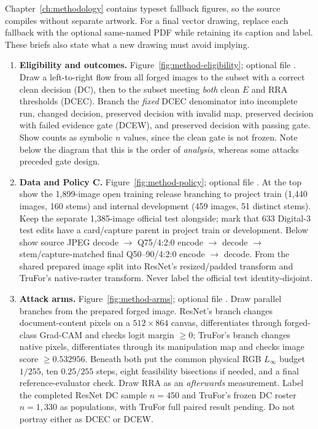 Chapter~\ref{ch:methodology} contains typeset fallback figures, so the source
compiles without separate artwork. For a final vector drawing, replace each
fallback with the optional same-named PDF while retaining its caption and
label. These briefs also state what a new drawing must avoid implying.

\begin{sloppypar}
\begin{enumerate}
    \item \textbf{Eligibility and outcomes.} Figure~\ref{fig:method-eligibility}; optional file . Draw a left-to-right flow from all forged images to the subset with a correct clean decision (DC), then to the subset meeting \emph{both} clean $E$ and RRA thresholds (DCEC). Branch the \emph{fixed} DCEC denominator into incomplete run, changed decision, preserved decision with invalid map, preserved decision with failed evidence gate (DCEW), and preserved decision with passing gate. Show counts as symbolic $n$ values, since the clean gate is not frozen. Note below the diagram that this is the order of \emph{analysis}, whereas some attacks preceded gate design.
    \item \textbf{Data and Policy C.} Figure~\ref{fig:method-policy}; optional file . At the top show the 1,899-image open training release branching to project train (1,440 images, 160 stems) and internal development (459 images, 51 distinct stems). Keep the separate 1,385-image official test alongside; mark that 633 Digital-3 test edits have a card/capture parent in project train or development. Below show source JPEG decode $\rightarrow$ Q75/4:2:0 encode $\rightarrow$ decode $\rightarrow$ stem/capture-matched final Q50--90/4:2:0 encode $\rightarrow$ decode. From the shared prepared image split into ResNet's resized/padded transform and TruFor's native-raster transform. Never label the official test identity-disjoint.
    \item \textbf{Attack arms.} Figure~\ref{fig:method-arms}; optional file . Draw parallel branches from the prepared forged image. ResNet's branch changes document-content pixels on a $512\times864$ canvas, differentiates through forged-class Grad-CAM and checks logit margin $\geq0$; TruFor's branch changes native pixels, differentiates through its manipulation map and checks image score $\geq0.532956$. Beneath both put the common physical RGB $L_\infty$ budget $1/255$, ten $0.25/255$ steps, eight feasibility bisections if needed, and a final reference-evaluator check. Draw RRA as an \emph{afterwards} measurement. Label the completed ResNet DC sample $n=450$ and TruFor's frozen DC roster $n=1{,}330$ as populations, with TruFor full paired result pending. Do not portray either as DCEC or DCEW.
\end{enumerate}
\end{sloppypar}